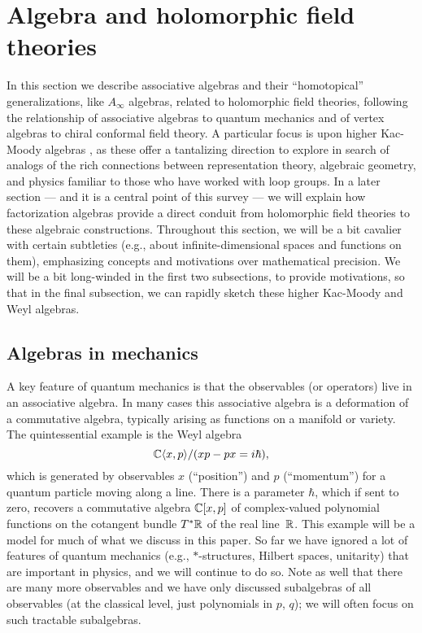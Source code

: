 \documentclass[11pt]{amsart}
\begin{document}
\section{Algebra and holomorphic field theories}
\label{sec: algebra}

In this section we describe  associative algebras and their ``homotopical'' generalizations, like $A_\infty$ algebras, related to holomorphic field theories,
following the relationship of associative algebras to quantum mechanics and of vertex algebras to chiral conformal field theory.
A particular focus is upon higher Kac-Moody algebras \cite{FHK},
as these offer a tantalizing direction to explore in search of analogs of the rich connections between representation theory, algebraic geometry, and physics familiar to those who have worked with loop groups.
In a later section --- and it is a central point of this survey --- we will explain how factorization algebras provide a direct conduit from holomorphic field theories to these algebraic constructions.
Throughout this section, we will be a bit cavalier with certain subtleties (e.g., about infinite-dimensional spaces and functions on them), 
emphasizing concepts and motivations over mathematical precision.
We will be a bit long-winded in the first two subsections, to provide motivations,
so that in the final subsection, we can rapidly sketch these higher Kac-Moody and Weyl algebras.

\subsection{Algebras in mechanics}

A key feature of quantum mechanics is that the observables (or operators) live in an associative algebra.
In many cases this associative algebra is a deformation of a commutative algebra, typically arising as functions on a manifold or variety.
The quintessential example is the Weyl algebra
\[
\mathbb C \langle x, p \rangle /(xp - px = i \hbar),
\] 
which is generated by observables $x$ (``position'') and $p$ (``momentum'') for a quantum particle moving along a line.
There is a parameter $\hbar$, which if sent to zero, recovers a commutative algebra $\mathbb C [ x, p ]$ of complex-valued polynomial functions on the cotangent bundle $T^* \mathbb R$ of the real line~$\mathbb R$.
This example will be a model for much of what we discuss in this paper.
So far we have ignored a lot of features of quantum mechanics (e.g., $\ast$-structures, Hilbert spaces, unitarity) that are important in physics,
and we will continue to do so.
Note as well that there are many more observables and we have only discussed subalgebras of all observables (at the classical level, just polynomials in $p$, $q$);
we will often focus on such tractable subalgebras. 
\end{document}
